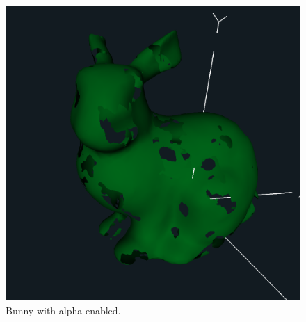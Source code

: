 \documentclass[12pt,letterpaper]{article}
\begin{document}
\begin{figure}[!h]
    \centering
    \includegraphics[width=1.0\textwidth]{img/bunny_alpha.png}
    \caption{Bunny with alpha enabled.}
    \label{fig:bunnyalpha}
\end{figure}
\end{document}
